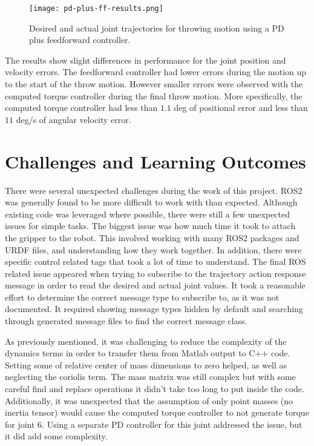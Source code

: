 \documentclass[conference]{IEEEtran}
\begin{document}
\begin{figure}[!t]
  \texttt{[image: pd-plus-ff-results.png]}
  \caption{Desired and actual joint trajectories for throwing motion using a PD plus feedforward controller.}
  \label{fig:pd-plus-ff-results}
\end{figure}

The results show slight differences in performance for the joint position and
velocity errors. The feedforward controller had lower errors during the motion
up to the start of the throw motion. However smaller errors were observed with
the computed torque controller during the final throw motion. More specifically,
the computed torque controller had less than $1.1$ deg of positional error and
less than $11$ deg/s of angular velocity error.

\section{Challenges and Learning Outcomes}
There were several unexpected challenges during the work of this project. ROS2
was generally found to be more difficult to work with than expected. Although
existing code was leveraged where possible, there were still a few unexpected
issues for simple tasks. The biggest issue was how much time it took to attach
the gripper to the robot. This involved working with many ROS2 packages and URDF
files, and understanding how they work together. In addition, there were
specific control related tags that took a lot of time to understand. The final
ROS related issue appeared when trying to subscribe to the trajectory action
response message in order to read the desired and actual joint values. It took a
reasonable effort to determine the correct message type to subscribe to, as it
was not documented. It required showing message types hidden by default and
searching through generated message files to find the correct message class.

As previously mentioned, it was challenging to reduce the complexity of the
dynamics terms in order to transfer them from Matlab output to C++ code. Setting
some of relative center of mass dimensions to zero helped, as well as neglecting
the coriolis term. The mass matrix was still complex but with some careful find
and replace operations it didn't take too long to put inside the
code. Additionally, it was unexpected that the assumption of only point masses
(no inertia tensor) would cause the computed torque controller to not
generate torque for joint 6. Using a separate PD controller for this joint
addressed the issue, but it did add some complexity.
\end{document}
